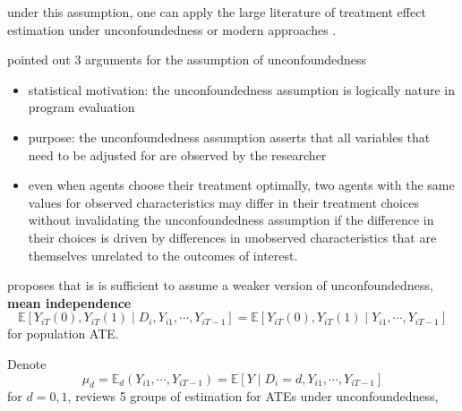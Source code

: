 \documentclass[twoside]{article}
\begin{document}
under this assumption, one can apply the large literature of treatment effect estimation under unconfoundedness \citep{imbens2004nonparametric} or modern approaches \citep{bang2005doubly,chernozhukov2017double,athey2018approximate}.

\citet{imbens2004nonparametric} pointed out 3 arguments for the assumption of unconfoundedness
\begin{itemize}
    \item statistical motivation: the unconfoundedness assumption is logically nature in program evaluation 
    \item purpose: the unconfoundedness assumption asserts that all variables that need to be adjusted for are observed by the researcher
    \item even when agents choose their treatment optimally, two agents with the same values for observed characteristics may differ in their treatment choices without invalidating the unconfoundedness assumption if the difference in their choices is driven by differences in unobserved characteristics that are themselves unrelated to the outcomes of interest.
\end{itemize}

\citet{imbens2004nonparametric} proposes that is is sufficient to assume a weaker version of unconfoundedness, \textbf{mean independence} $$ \mathbb{E}\left[Y_{iT}(0),Y_{iT}(1) \mid D_i, Y_{i1},\cdots,Y_{iT-1}\right] = \mathbb{E}\left[ Y_{iT}(0),Y_{iT}(1) \mid Y_{i1},\cdots,Y_{iT-1} \right] $$
for population ATE. 

Denote 
$$\mu_d = \mathbb{E}_d(Y_{i1},\cdots,Y_{iT-1}) = \mathbb{E}\left[Y\mid D_i=d,Y_{i1},\cdots,Y_{iT-1} \right]$$
for $d=0,1$, \citet{imbens2004nonparametric} reviews 5 groups of estimation for ATEs under unconfoundedness, 
\end{document}
